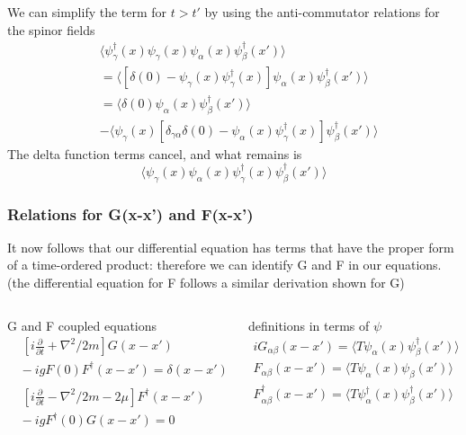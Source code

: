 \documentclass{beamer}
\begin{document}
\begin{frame}
We can simplify the term for $t > t'$ by using the anti-commutator relations for the spinor fields
\begin{eqnarray*}
&\langle\psi_{\gamma}^{\dagger}(x)\psi_{\gamma}(x) \psi_{\alpha}(x) \psi_{\beta}^{\dagger}(x')\rangle \\
& = \langle\left[\delta(0) - \psi_{\gamma}(x)\psi_{\gamma}^{\dagger}(x)\right]\psi_{\alpha}(x) \psi_{\beta}^{\dagger}(x')\rangle \\
& = \langle\delta(0) \psi_{\alpha}(x) \psi_{\beta}^{\dagger}(x')\rangle \\
& - \langle\psi_{\gamma}(x)\left[\delta_{\gamma\alpha}\delta(0) - \psi_{\alpha}(x) \psi_{\gamma}^{\dagger}(x)\right]\psi_{\beta}^{\dagger}(x')\rangle
\end{eqnarray*}
The delta function terms cancel, and  what remains is
\begin{equation*}
\langle\psi_{\gamma}(x)\psi_{\alpha}(x)\psi_{\gamma}^{\dagger}(x)  \psi_{\beta}^{\dagger}(x')\rangle
\end{equation*}
\end{frame}

\begin{frame}
\frametitle{Relations for G(x-x') and F(x-x')}
It now follows that our differential equation has terms that have the proper form of a time-ordered product: therefore we can identify G and F in our equations. (the differential equation for F follows a similar derivation shown for G)
\begin{columns}[T]
    \begin{column}{.5\textwidth}
     \begin{block}{G and F coupled equations}
		\begin{eqnarray*}
		& [i\frac{\partial}{\partial t} + \nabla^2 /2m]G(x-x') \\
		& - \ igF(0)F^{\dagger}(x-x') = \delta(x-x') \\
		\\
		&[i\frac{\partial}{\partial t} - \nabla^2 /2m - 2\mu]F^{\dagger}(x-x') \\
		& - \ igF^{\dagger}(0)G(x-x') = 0
		\end{eqnarray*}
    \end{block}
    \end{column}
    \begin{column}{.5\textwidth}
    \begin{block}{definitions in terms of $\psi$}
    \begin{eqnarray*}
    iG_{\alpha\beta}(x-x') = \langle T \psi_{\alpha}(x) \psi^{\dagger}_{\beta}(x')\rangle \\
F_{\alpha\beta}(x-x') = \langle T\psi_{\alpha}(x) \psi_{\beta}(x')\rangle \\
F_{\alpha\beta}^{\dagger}(x-x') = \langle T\psi_{\alpha}^{\dagger}(x) \psi_{\beta}^{\dagger}(x')\rangle
    \end{eqnarray*}
    \end{block}
    \end{column}
  \end{columns}

\end{frame}
\end{document}
